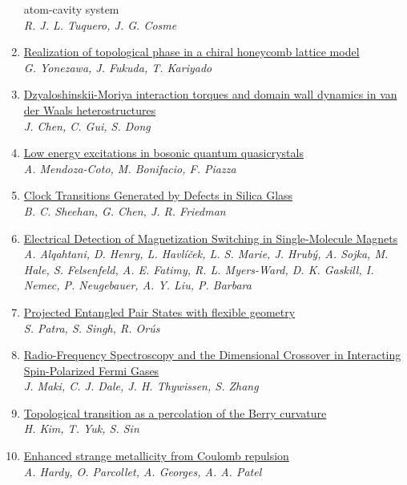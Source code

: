 \documentclass{article}
\begin{document}
\begin{enumerate}
{{  atom-cavity system}}\\
{\small\color{blue}\textsl{R. J. L. Tuquero, J. G. Cosme}}
\item\href{http://arxiv.org/abs/2407.21379v1}{\textsf{Realization of topological phase in a chiral honeycomb lattice model}}\\
{\small\color{blue}\textsl{G. Yonezawa, J. Fukuda, T. Kariyado}}
\item\href{http://arxiv.org/abs/2407.21254v1}{\textsf{Dzyaloshinskii-Moriya interaction torques and domain wall dynamics in
  van der Waals heterostructures}}\\
{\small\color{blue}\textsl{J. Chen, C. Gui, S. Dong}}
\item\href{http://arxiv.org/abs/2407.21230v1}{\textsf{Low energy excitations in bosonic quantum quasicrystals}}\\
{\small\color{blue}\textsl{A. Mendoza-Coto, M. Bonifacio, F. Piazza}}
\item\href{http://arxiv.org/abs/2407.21214v1}{\textsf{Clock Transitions Generated by Defects in Silica Glass}}\\
{\small\color{blue}\textsl{B. C. Sheehan, G. Chen, J. R. Friedman}}
\item\href{http://arxiv.org/abs/2407.21156v1}{\textsf{Electrical Detection of Magnetization Switching in Single-Molecule
  Magnets}}\\
{\small\color{blue}\textsl{A. Alqahtani, D. Henry, L. Havlíček, L. S. Marie, J. Hrubý, A. Sojka, M. Hale, S. Felsenfeld, A. E. Fatimy, R. L. Myers-Ward, D. K. Gaskill, I. Nemec, P. Neugebauer, A. Y. Liu, P. Barbara}}
\item\href{http://arxiv.org/abs/2407.21140v1}{\textsf{Projected Entangled Pair States with flexible geometry}}\\
{\small\color{blue}\textsl{S. Patra, S. Singh, R. Orús}}
\item\href{http://arxiv.org/abs/2407.21106v1}{\textsf{Radio-Frequency Spectroscopy and the Dimensional Crossover in
  Interacting Spin-Polarized Fermi Gases}}\\
{\small\color{blue}\textsl{J. Maki, C. J. Dale, J. H. Thywissen, S. Zhang}}
\item\href{http://arxiv.org/abs/2407.21098v1}{\textsf{Topological transition as a percolation of the Berry curvature}}\\
{\small\color{blue}\textsl{H. Kim, T. Yuk, S. Sin}}
\item\href{http://arxiv.org/abs/2407.21102v1}{\textsf{Enhanced strange metallicity from Coulomb repulsion}}\\
{\small\color{blue}\textsl{A. Hardy, O. Parcollet, A. Georges, A. A. Patel}}
\end{enumerate}
\end{document}
